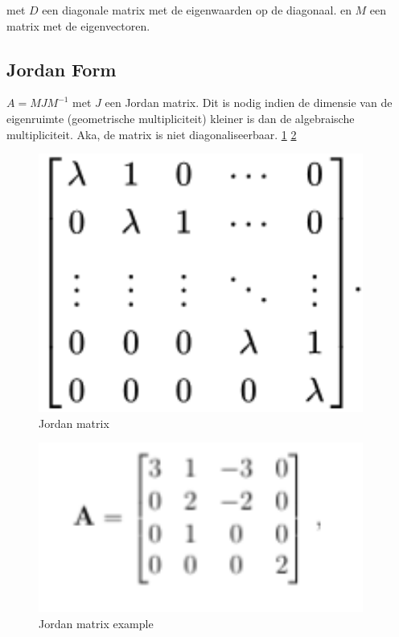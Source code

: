 \documentclass[a4paper]{article}
\begin{document}
met $D$ een diagonale matrix met de eigenwaarden op de diagonaal.
en $M$ een matrix met de eigenvectoren.

\subsection{Jordan Form}

$A = MJM^{-1}$
met $J$ een Jordan matrix.
Dit is nodig indien de dimensie van de eigenruimte (geometrische multipliciteit) kleiner is dan de algebraische multipliciteit.
Aka, de matrix is niet diagonaliseerbaar. \ref{fig:jordan} \ref{fig:jordan_ex}

\begin{figure}[htbp!]
	\begin{center}
		\includegraphics[width=0.95\textwidth]{./images/jordan.png}
	\end{center}
	\caption{Jordan matrix}
	\label{fig:jordan}
\end{figure}

\begin{figure}[htbp!]
	\begin{center}
		\includegraphics[width=0.95\textwidth]{./images/ex_joran.png}
	\end{center}
	\caption{Jordan matrix example}
	\label{fig:jordan_ex}
\end{figure}
\end{document}
